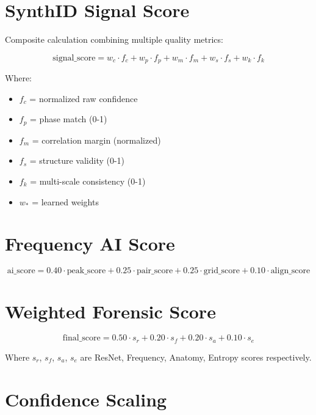 \documentclass[12pt,a4paper]{book}
\begin{document}
\begin{itemize}
\section{SynthID Signal Score}

Composite calculation combining multiple quality metrics:

\begin{equation}
\text{signal\_score} = w_c \cdot f_c + w_p \cdot f_p + w_m \cdot f_m + w_s \cdot f_s + w_k \cdot f_k
\end{equation}

Where:
\begin{itemize}
    \item $f_c$ = normalized raw confidence
    \item $f_p$ = phase match (0-1)
    \item $f_m$ = correlation margin (normalized)
    \item $f_s$ = structure validity (0-1)
    \item $f_k$ = multi-scale consistency (0-1)
    \item $w_*$ = learned weights
\end{itemize}

\section{Frequency AI Score}

\begin{equation}
\text{ai\_score} = 0.40 \cdot \text{peak\_score} + 0.25 \cdot \text{pair\_score} + 0.25 \cdot \text{grid\_score} + 0.10 \cdot \text{align\_score}
\end{equation}

\section{Weighted Forensic Score}

\begin{equation}
\text{final\_score} = 0.50 \cdot s_r + 0.20 \cdot s_f + 0.20 \cdot s_a + 0.10 \cdot s_e
\end{equation}

Where $s_r$, $s_f$, $s_a$, $s_e$ are ResNet, Frequency, Anatomy, Entropy scores respectively.

\section{Confidence Scaling}


\end{itemize}
\end{document}
